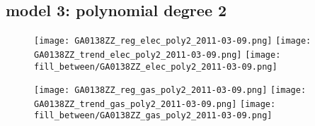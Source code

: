 \documentclass{article}
\begin{document}
\subsection{model 3: polynomial degree 2}
\begin{figure}
  \centering
  \texttt{[image: GA0138ZZ\_reg\_elec\_poly2\_2011-03-09.png]}
  \texttt{[image: GA0138ZZ\_trend\_elec\_poly2\_2011-03-09.png]}
  \texttt{[image: fill\_between/GA0138ZZ\_elec\_poly2\_2011-03-09.png]}
\end{figure}
\pagebreak
\begin{figure}
  \centering
  \texttt{[image: GA0138ZZ\_reg\_gas\_poly2\_2011-03-09.png]}
  \texttt{[image: GA0138ZZ\_trend\_gas\_poly2\_2011-03-09.png]}
  \texttt{[image: fill\_between/GA0138ZZ\_gas\_poly2\_2011-03-09.png]}
\end{figure}
\end{document}
